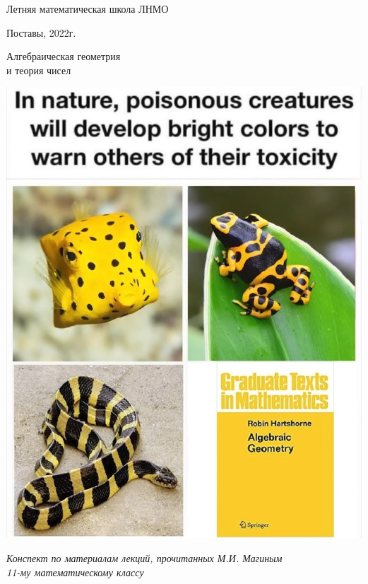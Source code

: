 \begin{titlepage}
	\centering
	
	{\Large \textsf{Летняя математическая школа ЛНМО} \par}
	
	\vspace{0.3cm}
	
	{\large \textsf{Поставы, 2022г.}\par}
	
	\vspace{1 cm}
	
	{\HUGE \textsf{Алгебраическая геометрия \\ и теория чисел} \par}
	
	\vspace{0.5cm}
	
	\includegraphics[scale = 0.4]{Title.jpg}
	
	\vspace{0.2cm}
	
	{\large \textsf{\textit{Конспект по материалам лекций, прочитанных М.И. Магиным \\ 11-му математическому классу}} \par}
	\vfill
	
	\begin{minipage}{6in}
		\centering
	\end{minipage}


\end{titlepage}
